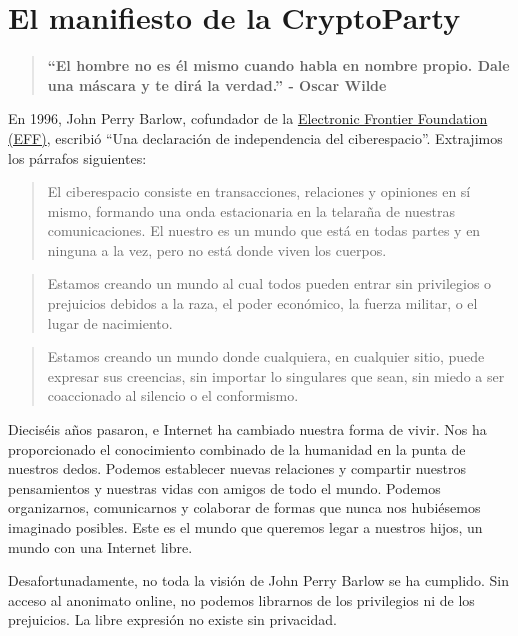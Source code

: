 \documentclass[10pt,a5paper,twoside,,]{book}
\begin{document}
\chapter{El manifiesto de la
CryptoParty}\label{el-manifiesto-de-la-cryptoparty}

\begin{quote}
\textbf{``El hombre no es él mismo cuando habla en nombre propio. Dale
una máscara y te dirá la verdad.'' - Oscar Wilde}
\end{quote}

En 1996, John Perry Barlow, cofundador de la
\href{https://www.eff.org/}{Electronic Frontier Foundation (EFF)},
escribió ``Una declaración de independencia del ciberespacio''.
Extrajimos los párrafos siguientes:

\begin{quote}
El ciberespacio consiste en transacciones, relaciones y opiniones en sí
mismo, formando una onda estacionaria en la telaraña de nuestras
comunicaciones. El nuestro es un mundo que está en todas partes y en
ninguna a la vez, pero no está donde viven los cuerpos.
\end{quote}

\begin{quote}
Estamos creando un mundo al cual todos pueden entrar sin privilegios o
prejuicios debidos a la raza, el poder económico, la fuerza militar, o
el lugar de nacimiento.
\end{quote}

\begin{quote}
Estamos creando un mundo donde cualquiera, en cualquier sitio, puede
expresar sus creencias, sin importar lo singulares que sean, sin miedo a
ser coaccionado al silencio o el conformismo.
\end{quote}

Dieciséis años pasaron, e Internet ha cambiado nuestra forma de vivir.
Nos ha proporcionado el conocimiento combinado de la humanidad en la
punta de nuestros dedos. Podemos establecer nuevas relaciones y
compartir nuestros pensamientos y nuestras vidas con amigos de todo el
mundo. Podemos organizarnos, comunicarnos y colaborar de formas que
nunca nos hubiésemos imaginado posibles. Este es el mundo que queremos
legar a nuestros hijos, un mundo con una Internet libre.

Desafortunadamente, no toda la visión de John Perry Barlow se ha
cumplido. Sin acceso al anonimato online, no podemos librarnos de los
privilegios ni de los prejuicios. La libre expresión no existe sin
privacidad.
\end{document}
